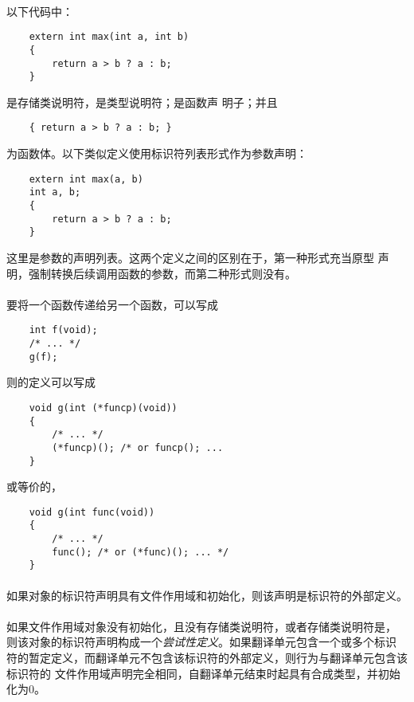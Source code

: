 {\paragraph{}
\ex 以下代码中：
\begin{lstlisting}
    extern int max(int a, int b)
    {
        return a > b ? a : b;
    }
\end{lstlisting}
是存储类说明符，是类型说明符；是函数声
明子；并且
\begin{lstlisting}
    { return a > b ? a : b; }
\end{lstlisting}
为函数体。以下类似定义使用标识符列表形式作为参数声明：
\begin{lstlisting}
    extern int max(a, b)
    int a, b;
    {
        return a > b ? a : b;
    }
\end{lstlisting}
这里是参数的声明列表。这两个定义之间的区别在于，第一种形式充当原型
声明，强制转换后续调用函数的参数，而第二种形式则没有。

\paragraph{}
\ex 要将一个函数传递给另一个函数，可以写成
\begin{lstlisting}
    int f(void);
    /* ... */
    g(f);
\end{lstlisting}
则的定义可以写成
\begin{lstlisting}
    void g(int (*funcp)(void))
    {
        /* ... */
        (*funcp)(); /* or funcp(); ...
    }
\end{lstlisting}
或等价的，
\begin{lstlisting}
    void g(int func(void))
    {
        /* ... */
        func(); /* or (*func)(); ... */
    }
\end{lstlisting}

\semantic
\paragraph{}
如果对象的标识符声明具有文件作用域和初始化，则该声明是标识符的外部定义。

\paragraph{}
如果文件作用域对象没有初始化，且没有存储类说明符，或者存储类说明符是，
则该对象的标识符声明构成一个\textit{尝试性定义}。如果翻译单元包含一个或多个标识
符的暂定定义，而翻译单元不包含该标识符的外部定义，则行为与翻译单元包含该标识符的
文件作用域声明完全相同，自翻译单元结束时起具有合成类型，并初始化为0。

}
